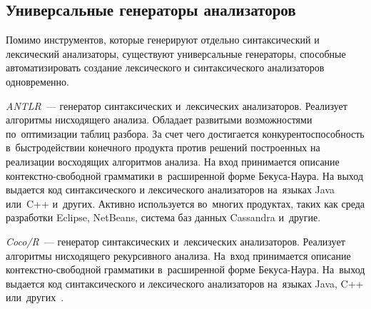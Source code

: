 \subsection{Универсальные генераторы анализаторов} \label{sub118}

Помимо инструментов, которые генерируют отдельно синтаксический и лексический анализаторы, существуют универсальные генераторы, способные автоматизировать создание лексического и синтаксического анализаторов одновременно. 

\textit{ANTLR}~--- генератор синтаксических и~лексических анализаторов. Реализует алгоритмы нисходящего анализа. Обладает развитыми возможностями по~оптимизации таблиц разбора. За счет чего достигается конкурентоспособность в~быстродействии конечного продукта против решений построенных на реализации восходящих алгоритмов анализа.
На вход принимается описание контекстно-свободной грамматики в~расширенной форме Бекуса-Наура. На выход выдается код синтаксического и лексического анализаторов на~языках Java или~C++ и~других. Активно
используется во~многих продуктах, таких как среда разработки Eclipse, NetBeans, система баз данных Cassandra и~другие.

\textit{Coco/R}~--- генератор синтаксических и~лексических анализаторов. Реализует алгоритмы нисходящего рекурсивного анализа. На~вход принимается описание контекстно-свободной грамматики в~расширенной форме Бекуса-Наура. На~выход выдается код синтаксического и лексического анализаторов на~языках Java, C++ или~других~\cite{dskMag}.